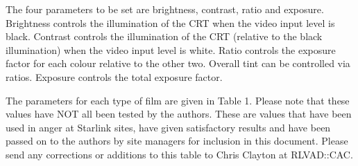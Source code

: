 The four parameters to be set are brightness, contrast, ratio and exposure.
Brightness controls the illumination of the CRT when the video input level is
black. Contrast controls the illumination of the CRT (relative to the black
illumination) when the video input level is white. Ratio controls the exposure
factor for each colour relative to the other two. Overall tint can be
controlled via ratios. Exposure controls the total
exposure factor.

The parameters for each type of film are given in Table 1. Please note that
these values have NOT all been tested by the authors. These are values that have
been used in anger at Starlink sites, have given satisfactory results and
have been passed on to the authors by site managers for inclusion in this
document. Please send any corrections or additions to this table to Chris
Clayton at RLVAD::CAC.
     				
